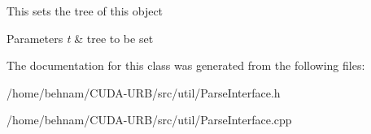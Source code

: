 This sets the tree of this object 
\begin{DoxyParams}{Parameters}
{\em t} & tree to be set \\
\hline
\end{DoxyParams}


The documentation for this class was generated from the following files\+:\begin{DoxyCompactItemize}
\item 
/home/behnam/\+C\+U\+D\+A-\/\+U\+R\+B/src/util/Parse\+Interface.\+h\item 
/home/behnam/\+C\+U\+D\+A-\/\+U\+R\+B/src/util/Parse\+Interface.\+cpp\end{DoxyCompactItemize}
